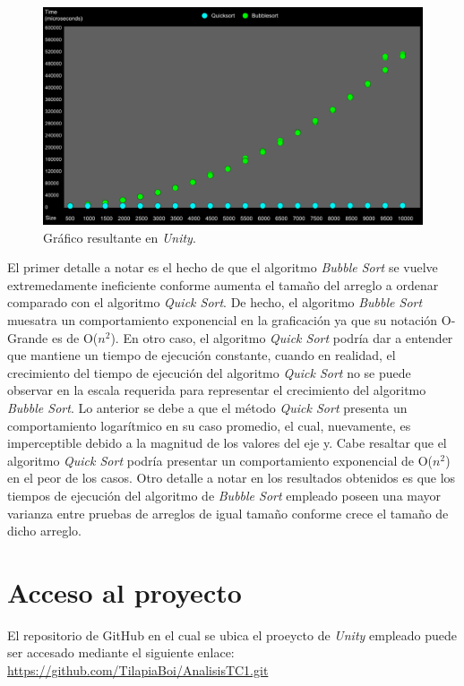 \documentclass[conference]{IEEEtran}
\begin{document}
\begin{figure}[htbp]
\centerline{\includegraphics[scale=0.34]{grafico.png}}
\caption{Gráfico resultante en \textit{Unity}.}
\label{fig}
\end{figure}

El primer detalle a notar es el hecho de que el algoritmo \textit{Bubble Sort} se vuelve extremedamente ineficiente conforme
aumenta el tamaño del arreglo a ordenar comparado con el algoritmo \textit{Quick Sort}. De hecho, el algoritmo \textit{Bubble Sort} muesatra un comportamiento exponencial en la graficación ya que su notación O-Grande es de O($n^{2}$). En otro caso, el algoritmo \textit{Quick Sort} podría dar a entender que mantiene un tiempo de ejecución constante, cuando en realidad, el crecimiento del tiempo de ejecución del algoritmo \textit{Quick Sort} no se puede observar en la escala requerida para representar
el crecimiento del algoritmo \textit{Bubble Sort}. Lo anterior se debe a que el método \textit{Quick Sort} presenta un comportamiento logarítmico en su caso promedio, el cual, nuevamente, es imperceptible debido a la magnitud de los valores del eje y. Cabe resaltar que el algoritmo \textit{Quick Sort} podría presentar un comportamiento exponencial de O($n^{2}$) en el peor de los casos.
Otro detalle a notar en los resultados obtenidos es que los tiempos de ejecución del algoritmo de \textit{Bubble Sort} empleado poseen 
una mayor varianza entre pruebas de arreglos de igual tamaño conforme crece el tamaño de dicho arreglo.

\section{Acceso al proyecto}
El repositorio de GitHub en el cual se ubica el proeycto de \textit{Unity} empleado puede ser accesado mediante el siguiente enlace: \url{https://github.com/TilapiaBoi/AnalisisTC1.git}
\end{document}
